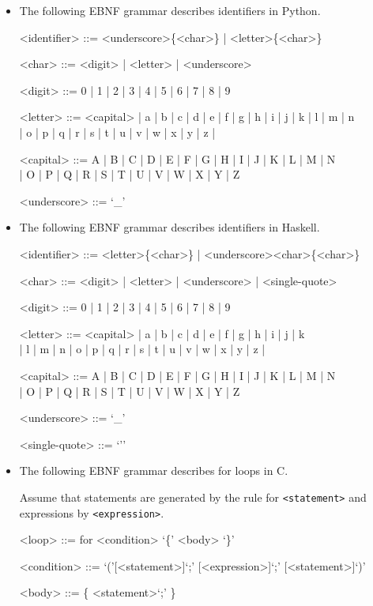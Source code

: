 \documentclass[12pt, fleqn]{article}
\begin{document}
\begin{itemize}

\item The following EBNF grammar describes identifiers in Python.

\begin{grammar}
<identifier> ::= <underscore>\{<char>\} | <letter>\{<char>\}

<char> ::= <digit> | <letter> | <underscore>

<digit> ::= 0 | 1 | 2 | 3 | 4 | 5 | 6 | 7 | 8 | 9

<letter> ::= <capital> | a | b | c | d | e | f | g | h | i | j | k | l | m | n\\
 | o | p | q | r | s | t | u | v | w | x | y | z | 

<capital> ::= A | B | C | D | E | F | G | H | I | J | K | L | M | N\\
| O | P | Q | R | S | T | U | V | W | X | Y | Z

<underscore> ::= `_'
\end{grammar}

\item The following EBNF grammar describes identifiers in Haskell.

\begin{grammar}
<identifier> ::= <letter>\{<char>\} | <underscore><char>\{<char>\}

<char> ::= <digit> | <letter> | <underscore> | <single-quote>

<digit> ::= 0 | 1 | 2 | 3 | 4 | 5 | 6 | 7 | 8 | 9

<letter> ::= <capital> |  a | b | c | d | e | f | g | h | i | j | k\\
 | l | m | n | o | p | q | r | s | t | u | v | w | x | y | z | 

<capital> ::= A | B | C | D | E | F | G | H | I | J | K | L | M | N\\
| O | P | Q | R | S | T | U | V | W | X | Y | Z

<underscore> ::= `_'

<single-quote> ::= `''
\end{grammar}

\item The following EBNF grammar describes for loops in C.

Assume that statements are generated by the rule for \verb|<statement>| and expressions
by \verb|<expression>|.

\begin{grammar}

<loop> ::= for <condition> `\{' <body> `\}'

<condition> ::= `('[<statement>]`;' [<expression>]`;' [<statement>]`)'

<body> ::= \{ <statement>`;' \}

\end{grammar}

\end{itemize}
\end{document}
